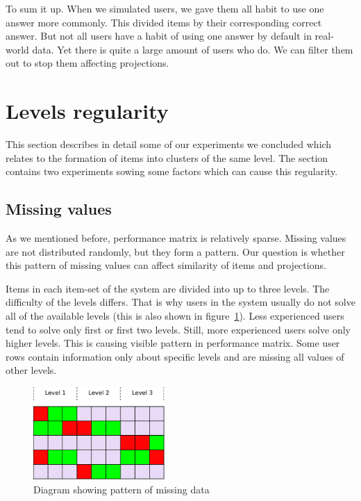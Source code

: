 \documentclass[
  printed, %
  table,   %
  nolof,     %
  nolot,     %
  color,
  final,
  nocover
]{fithesis3}
\begin{document}

To sum it up. When we simulated users, we gave them all habit to use one answer more commonly. This divided items by their corresponding correct answer. But not all users have a habit of using one answer by default in real-world data. Yet there is quite a large amount of users who do. We can filter them out to stop them affecting projections.


\section{Levels regularity}\label{evaulation-levels-regularity}

This section describes in detail some of our experiments we concluded which relates to the formation of items into clusters of the same level. The section contains two experiments sowing some factors which can cause this regularity.


\subsection{Missing values}\label{missing-values}


As we mentioned before, performance matrix is relatively sparse. Missing values are not distributed randomly, but they form a pattern. Our question is whether this pattern of missing values can affect similarity of items and projections.


Items in each item-set of the system are divided into up to three levels. The difficulty of the levels differs. That is why users in the system usually do not solve all of the available levels (this is also shown in figure~\ref{fig:missing_pattern_diagram}). Less experienced users tend to solve only first or first two levels. Still, more experienced users solve only higher levels. This is causing visible pattern in performance matrix. Some user rows contain information only about specific levels and are missing all values of other levels.

\begin{figure}
  \includegraphics[width=5cm]{img/missing_pattern_diagram}
  \caption{Diagram showing pattern of missing data}
  \label{fig:missing_pattern_diagram}
\end{figure}
\end{document}
